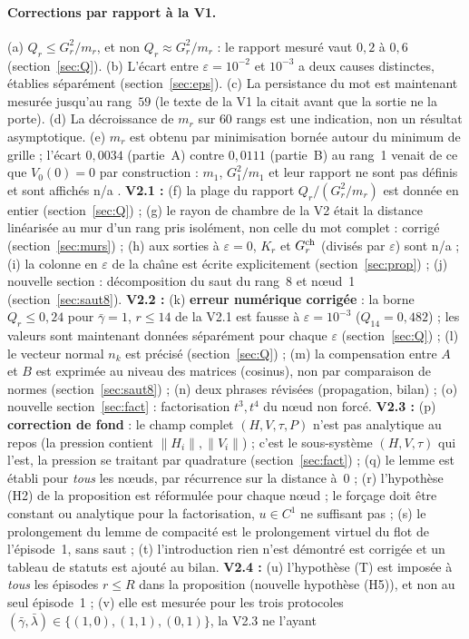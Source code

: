 \documentclass[11pt,a4paper]{article}
\theoremstyle{remark}
\begin{document}
\paragraph{Corrections par rapport \`a la V1.}
(a) $Q_r\le G_r^2/m_r$, et non $Q_r\approx G_r^2/m_r$ : le rapport mesur\'e vaut $0{,}2$ \`a $0{,}6$ (section~\ref{sec:Q}). (b) L'\'ecart entre $\varepsilon=10^{-2}$ et $10^{-3}$ a deux causes distinctes, \'etablies s\'epar\'ement (section~\ref{sec:eps}). (c) La persistance du mot est maintenant mesur\'ee jusqu'au rang~$59$ (le texte de la V1 la citait avant que la sortie ne la porte). (d) La d\'ecroissance de $m_r$ sur $60$ rangs est une indication, non un r\'esultat asymptotique. (e) $m_r$ est obtenu par minimisation born\'ee autour du minimum de grille ; l'\'ecart $0{,}0034$ (partie~A) contre $0{,}0111$ (partie~B) au rang~1 venait de ce que $V_0(0)=0$ par construction : $m_1$, $G_1^2/m_1$ et leur rapport ne sont pas d\'efinis et sont affich\'es \og n/a \fg. \textbf{V2.1 :} (f) la plage du rapport $Q_r/(G_r^2/m_r)$ est donn\'ee en entier (section~\ref{sec:Q}) ; (g) le \og rayon de chambre \fg{} de la V2 \'etait la distance lin\'earis\'ee au mur d'un rang pris isol\'ement, non celle du mot complet : corrig\'e (section~\ref{sec:murs}) ; (h) aux sorties \`a $\varepsilon=0$, $K_r$ et $G_r^{\rm ch}$ (divis\'es par $\varepsilon$) sont \og n/a \fg{} ; (i) la colonne en $\varepsilon$ de la cha\^{\i}ne est \'ecrite explicitement (section~\ref{sec:prop}) ; (j) nouvelle section : d\'ecomposition du saut du rang~8 et n\oe ud~1 (section~\ref{sec:saut8}). \textbf{V2.2 :} (k) \textbf{erreur num\'erique corrig\'ee} : la borne \og $Q_r\le0{,}24$ pour $\bar\gamma=1$, $r\le14$ \fg{} de la V2.1 est fausse \`a $\varepsilon=10^{-3}$ ($Q_{14}=0{,}482$) ; les valeurs sont maintenant donn\'ees s\'epar\'ement pour chaque $\varepsilon$ (section~\ref{sec:Q}) ; (l) le vecteur normal $n_k$ est pr\'ecis\'e (section~\ref{sec:Q}) ; (m) la compensation entre $A$ et $B$ est exprim\'ee au niveau des matrices (cosinus), non par comparaison de normes (section~\ref{sec:saut8}) ; (n) deux phrases r\'evis\'ees (propagation, bilan) ; (o) nouvelle section~\ref{sec:fact} : factorisation $t^3,t^4$ du n\oe ud non forc\'e. \textbf{V2.3 :} (p) \textbf{correction de fond} : le champ complet $(H,V,\tau,P)$ n'est pas analytique au repos (la pression contient $\lVert H_i\rVert,\lVert V_i\rVert$) ; c'est le sous-syst\`eme $(H,V,\tau)$ qui l'est, la pression se traitant par quadrature (section~\ref{sec:fact}) ; (q) le lemme est \'etabli pour \emph{tous} les n\oe uds, par r\'ecurrence sur la distance \`a~0 ; (r) l'hypoth\`ese (H2) de la proposition est r\'eformul\'ee pour chaque n\oe ud ; le for\c{c}age doit \^etre constant ou analytique pour la factorisation, $u\in C^1$ ne suffisant pas ; (s) le prolongement du lemme de compacit\'e est le prolongement virtuel du flot de l'\'episode~1, sans saut ; (t) l'introduction \og rien n'est d\'emontr\'e \fg{} est corrig\'ee et un tableau de statuts est ajout\'e au bilan. \textbf{V2.4 :} (u) l'hypoth\`ese (T) est impos\'ee \`a \emph{tous} les \'episodes $r\le R$ dans la proposition (nouvelle hypoth\`ese (H5)), et non au seul \'episode~1 ; (v) elle est mesur\'ee pour les trois protocoles $(\bar\gamma,\bar\lambda)\in\{(1,0),(1,1),(0,1)\}$, la V2.3 ne l'ayant 
\end{document}
